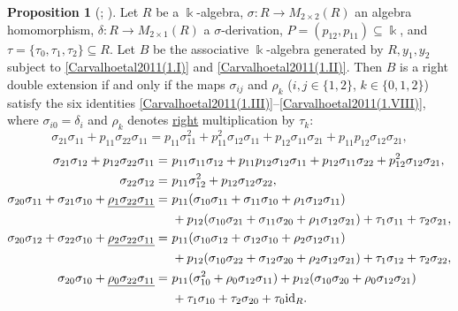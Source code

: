 \documentclass{amsart}
\theoremstyle{definition}
\newtheorem{proposition}[theorem]{Proposition}
\theoremstyle{remark}
\numberwithin{equation}{section}
\begin{document}
\begin{proposition}[{\cite[Lemma 1.10 and Proposition 1.11]{ZhangZhang2008}; \cite[Proposition 1.5]{Carvalhoetal2011}}]\label{Carvalhoetal2011Proposition1.5}
Let $R$ be a $\Bbbk$-algebra, $\sigma:R\to M_{2\times 2}(R)$ an algebra homomorphism, $\delta:R\to M_{2\times 1}(R)$ a $\sigma$-derivation, $P=(p_{12},p_{11})\subseteq \Bbbk$, and $\tau=\{\tau_0,\tau_1,\tau_2\}\subseteq R$.
Let $B$ be the associative $\Bbbk$-algebra generated by $R,y_1,y_2$ subject to \eqref{Carvalhoetal2011(1.I)} and \eqref{Carvalhoetal2011(1.II)}.
Then $B$ is a right double extension if and only if the maps $\sigma_{ij}$ and $\rho_k$ ($i,j\in\{1,2\}$, $k\in\{0,1,2\}$) satisfy the six identities \eqref{Carvalhoetal2011(1.III)}--\eqref{Carvalhoetal2011(1.VIII)}, where $\sigma_{i0}=\delta_i$ and $\rho_k$ denotes \underline{right} multiplication by $\tau_k$:
\begin{equation}\label{Carvalhoetal2011(1.III)} 
    \sigma_{21} \sigma_{11} + p_{11}\sigma_{22}\sigma_{11} = p_{11}\sigma_{11}^2 + p_{11}^2 \sigma_{12}\sigma_{11} + p_{12}\sigma_{11}\sigma_{21} + p_{11}p_{12}\sigma_{12}\sigma_{21},
\end{equation}
\begin{align}    
    \sigma_{21} \sigma_{12} + p_{12} \sigma_{22} \sigma_{11} = &\ p_{11} \sigma_{11} \sigma_{12} + p_{11}p_{12}\sigma_{12}\sigma_{11} + p_{12}\sigma_{11}\sigma_{22} + p_{12}^2\sigma_{12}\sigma_{21}, \\
    \sigma_{22}\sigma_{12} = &\ p_{11} \sigma_{12}^2 + p_{12}\sigma_{12}\sigma_{22}, \\
    \sigma_{20} \sigma_{11} + \sigma_{21}\sigma_{10} + \underline{\rho_1 \sigma_{22}\sigma_{11}} = &\ p_{11} (\sigma_{10} \sigma_{11} + \sigma_{11}\sigma_{10} + \rho_{1}\sigma_{12}\sigma_{11}) \notag \\
    &\ + p_{12} (\sigma_{10} \sigma_{21} + \sigma_{11} \sigma_{20} + \rho_1 \sigma_{12} \sigma_{21}) + \tau_1 \sigma_{11} + \tau_2 \sigma_{21}, \\
    \sigma_{20} \sigma_{12} + \sigma_{22} \sigma_{10} + \underline{\rho_2 \sigma_{22} \sigma_{11}} = &\ p_{11} (\sigma_{10} \sigma_{12} + \sigma_{12}\sigma_{10} + \rho_{2} \sigma_{12} \sigma_{11}) \notag \\
    &\ +p_{12} (\sigma_{10} \sigma_{22} + \sigma_{12} \sigma_{20} + \rho_2 \sigma_{12} \sigma_{21}) +  \tau_{1} \sigma_{12} + \tau_2 \sigma_{22}, \\
    \sigma_{20} \sigma_{10} + \underline{\rho_0 \sigma_{22} \sigma_{11}} = &\ p_{11} (\sigma_{10}^2 + \rho_0 \sigma_{12} \sigma_{11}) + p_{12} (\sigma_{10} \sigma_{20} + \rho_0 \sigma_{12} \sigma_{21})\notag \\
    &\ + \tau_1 \sigma_{10} + \tau_2 \sigma_{20} + \tau_0 {\rm id}_R. \label{Carvalhoetal2011(1.VIII)}
\end{align}
\end{proposition}
\end{document}
